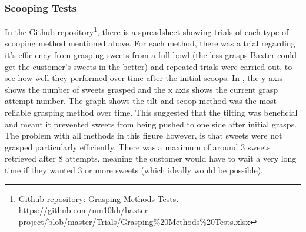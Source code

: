 \subsubsection{Scooping Tests}
\label{sssec:ScoopTest}
In the Github repository\footnote{Github repository: Grasping Methods Tests. \url{https://github.com/um10kh/baxter-project/blob/master/Trials/Grasping\%20Methods\%20Tests.xlsx}}, there is a spreadsheet showing trials of each type of scooping method mentioned above. For each method, there was a trial regarding it's efficiency from grasping sweets from a full bowl (the less grasps Baxter could get the customer's sweets in the better) and repeated trials were carried out, to see how well they performed over time after the initial scoops.
\newline\newline
In \textbf{}, the y axis shows the number of sweets grasped and the x axis shows the current grasp attempt number. The graph shows the tilt and scoop method was the most reliable grasping method over time. This suggested that the tilting was beneficial and meant it prevented sweets from being pushed to one side after initial grasps. The problem with all methods in this figure however, is that sweets were not grasped particularly efficiently. There was a maximum of around 3 sweets retrieved after 8 attempts, meaning the customer would have to wait a very long time if they wanted 3 or more sweets (which ideally would be possible).
